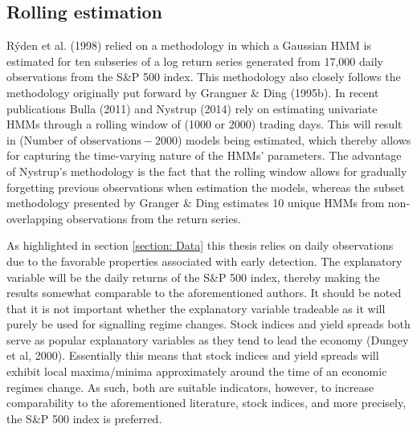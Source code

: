 \subsection{Rolling estimation}
Rýden et al. (1998) relied on a methodology in which a Gaussian HMM is estimated for ten subseries of a log return series generated from 17,000 daily observations from the S\&P 500 index. This methodology also closely follows the methodology originally put forward by Grangner \& Ding (1995b). In recent publications Bulla (2011) and Nystrup (2014) rely on estimating univariate HMMs through a rolling window of (1000 or 2000) trading days. This will result in ($\text{Number of observations} - 2000$) models being estimated, which thereby allows for capturing the time-varying nature of the HMMs' parameters. The advantage of Nystrup's methodology is the fact that the rolling window allows for gradually forgetting previous observations when estimation the models, whereas the subset methodology presented by Granger \& Ding estimates 10 unique HMMs from non-overlapping observations from the return series. 

As highlighted in section \ref{section: Data} this thesis relies on daily observations due to the favorable properties associated with early detection. The explanatory variable will be the daily returns of the S\&P 500 index, thereby making the results somewhat comparable to the aforementioned authors. It should be noted that it is not important whether the explanatory variable tradeable as it will purely be used for signalling regime changes. Stock indices and yield spreads both serve as popular explanatory variables as they tend to lead the economy (Dungey et al, 2000). Essentially this means that stock indices and yield spreads will exhibit local maxima/minima approximately around the time of an economic regimes change. As such, both are suitable indicators, however, to increase comparability to the aforementioned literature, stock indices, and more precisely, the S\&P 500 index is preferred. 

